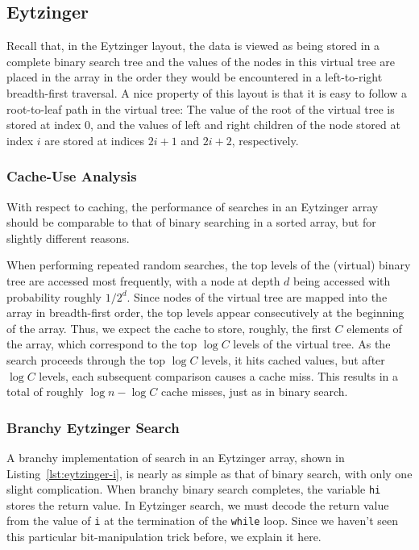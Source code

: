 \documentclass{patmorin}
\newcommand{\lstref}[1]{Listing~\ref{lst:#1}}
\begin{document}
\subsection{Eytzinger}

Recall that, in the Eytzinger layout, the data is viewed as being
stored in a complete binary search tree and the values of the nodes in
this virtual tree are placed in the array in the order they would be
encountered in a left-to-right breadth-first traversal.  A nice property
of this layout is that it is easy to follow a root-to-leaf path in the
virtual tree: The value of the root of the virtual tree is stored at
index 0, and the values of left and right children of the node stored
at index $i$ are stored at indices $2i+1$ and $2i+2$, respectively.


\subsubsection{Cache-Use Analysis}

With respect to caching, the performance of searches in an Eytzinger
array should be comparable to that of binary searching in a sorted array,
but for slightly different reasons.

When performing repeated random searches, the top levels of the (virtual)
binary tree are accessed most frequently, with a node at depth $d$
being accessed with probability roughly $1/2^d$.  Since nodes of the
virtual tree are mapped into the array in breadth-first order, the
top levels appear consecutively at the beginning of the array. Thus,
we expect the cache to store, roughly, the first $C$ elements of the
array, which correspond to the top $\log C$ levels of the virtual tree.
As the search proceeds through the top $\log C$ levels, it hits cached
values, but after $\log C$ levels, each subsequent comparison causes
a cache miss.  This results in a total of roughly $\log n-\log C$ cache
misses, just as in binary search.

\subsubsection{Branchy Eytzinger Search}

A branchy implementation of search in an Eytzinger array, shown in
\lstref{eytzinger-i}, is nearly as simple as that of binary search, with
only one slight complication. When branchy binary search completes, the
variable \texttt{hi} stores the return value. In Eytzinger search,
we must decode the return value from the value of \texttt{i}
at the termination of the \texttt{while} loop.  Since we haven't seen
this particular bit-manipulation trick before, we explain it here.
\end{document}
